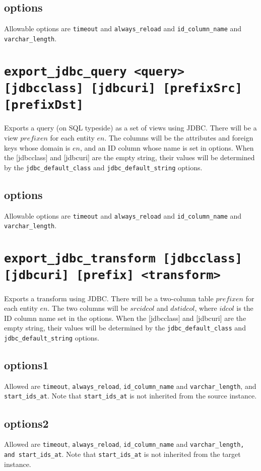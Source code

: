 \documentclass[10pt]{book}
\begin{document}
\subsection{options}
Allowable options are {\tt timeout}  and {\tt always\_reload} and  {\tt id\_column\_name} and {\tt varchar\_length}.

\section{{\tt export\_jdbc\_query <query> [jdbcclass] [jdbcuri] [prefixSrc] [prefixDst] }}

Exports a query (on SQL typeside) as a set of views using JDBC.  There will be a view $prefixen$ for each entity $en$.  The columns will be the attributes and foreign keys whose domain is $en$, and an ID column whose name is set in options.  When the [jdbcclass] and [jdbcuri] are the empty string, their values will be determined by the {\tt jdbc\_default\_class} and {\tt jdbc\_default\_string} options.

\subsection{options}
Allowable options are {\tt timeout}  and {\tt always\_reload} and  {\tt id\_column\_name} and {\tt varchar\_length}.



\section{{\tt export\_jdbc\_transform [jdbcclass] [jdbcuri] [prefix] <transform>}}
Exports a transform using JDBC.  There will be a two-column table $prefixen$ for each entity $en$.  The two columns will be $srcidcol$ and $dstidcol$, where $idcol$ is the ID column name set in the options.   When the [jdbcclass] and [jdbcuri] are the empty string, their values will be determined by the {\tt jdbc\_default\_class} and {\tt jdbc\_default\_string} options.

\subsection{options1}
Allowed are {\tt timeout}, {\tt always\_reload},  {\tt id\_column\_name} and {\tt varchar\_length}, and {\tt start\_ids\_at}.  Note that {\tt start\_ids\_at} is not inherited from the source instance.
\subsection{options2}
Allowed are {\tt timeout}, {\tt always\_reload},  {\tt id\_column\_name} and {\tt varchar\_length, and {\tt start\_ids\_at}}.  Note that {\tt start\_ids\_at} is not inherited from the target instance.
\end{document}
